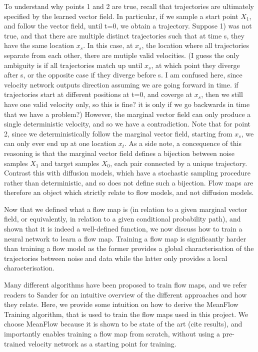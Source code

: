 \documentclass[12pt,a4paper]{report}
\begin{document}
To understand why points 1 and 2 are true, recall that trajectories are ultimately specified by the learned vector field. In particular, if we sample a start point $X_1$, and follow the vector field, until t=0, we obtain a trajectory. 
Suppose 1) was not true, and that there are multiple distinct trajectories such that at time s, they have the same location $x_s$. In this case, at $x_s$, the location where all trajectories separate from each other, there are mutiple valid velocities. (I guess the only ambiguity is if all trajectories match up until $x_s$, at which point they diverge after s, or the opposite case if they diverge before s. I am confused here, since velocity network outputs direction assuming we are going forward in time. if trajectories start at different positions at t=0, and coverge at $x_s$, then we still have one valid velocity only, so this is fine? it is only if we go backwards in time that we have a problem?) However, the marginal vector field can only produce a single deterministic velocity, and so we have a contradiction. 
Note that for point 2, since we deterministically follow the marginal vector field, starting from $x_s$, we can only ever end up at one location $x_t$.  
As a side note, a concequence of this reasoning is that the marginal vector field defines a bijection between noise samples $X_1$ and target samples $X_0$, each pair connected by a unique trajectory.  
Contrast this with diffusion models, which have a stochastic sampling procedure rather than deterministic, and so does not define such a bijection. 
Flow maps are therefore an object which strictly relate to flow models, and not diffusion models. 

Now that we defined what a flow map is (in relation to a given marginal vector field, or equivalently, in relation to a given conditional probability path), and shown that it is indeed a well-defined function, we now discuss how to train a neural network to learn a flow map. Training a flow map is significantly harder than training a flow model as the former provides a global characterisation of the trajectories between noise and data while the latter only provides a local characterisation. 

Many different algorithms have been proposed to train flow maps, and we refer readers to Sander for an intuitive overview of the different approaches and how they relate. Here, we provide some intuition on how to derive the MeanFlow Training algorithm, that is used to train the flow maps used in this project. We choose MeanFlow because it is shown to be state of the art (cite results), and importantly enables training a flow map from scratch, without using a pre-trained velocity network as a starting point for training. 
\end{document}
